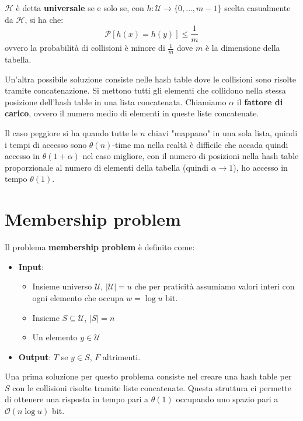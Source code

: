 $\mathcal{H}$ è detta \textbf{universale} se e solo se, con $h : \mathcal{U} \to \{0, \dots, m - 1\}$ scelta casualmente da $\mathcal{H}$, si ha che: 
\begin{equation}
    \mathcal{P}[h(x) = h(y)] \leq \frac{1}{m}
\end{equation}
ovvero la probabilità di collisioni è minore di $\frac{1}{m}$ dove $m$ è la dimensione della tabella.

Un'altra possibile soluzione consiste nelle hash table dove le collisioni sono risolte tramite concatenazione. Si mettono tutti gli elementi che collidono nella stessa posizione dell'hash table in una lista concatenata. Chiamiamo $\alpha$ il \textbf{fattore di carico}, ovvero il numero medio di elementi in queste liste concatenate.

Il caso peggiore si ha quando tutte le $n$ chiavi "mappano" in una sola lista, quindi i tempi di accesso sono $\theta(n)$-time ma nella realtà è difficile che accada quindi accesso in $\theta(1 + \alpha)$ nel caso migliore, con il numero di posizioni nella hash table proporzionale al numero di elementi della tabella (quindi $\alpha \to 1$), ho accesso in tempo $\theta(1)$.
\section{Membership problem}
\begin{definizione}
    Il problema \textbf{membership problem} è definito come:
    \begin{itemize}
        \item \textbf{Input}:
        \begin{itemize}
            \item Insieme universo $\mathcal{U}$, $|\mathcal{U}| = u$ che per praticità assumiamo valori interi con ogni elemento che occupa $w = \log u$ bit.
            \item Insieme $S \subseteq \mathcal{U}$, $|S| = n$
            \item Un elemento $y \in \mathcal{U}$
        \end{itemize}
        \item \textbf{Output}: $T$ se $y \in S$, $F$ altrimenti.
    \end{itemize}
\end{definizione}

Una prima soluzione per questo problema consiste nel creare una hash table per $S$ con le collisioni risolte tramite liste concatenate. Questa struttura ci permette di ottenere una risposta in tempo pari a $\theta(1)$ occupando uno spazio pari a $\mathcal{O}(n \log u)$ bit.

